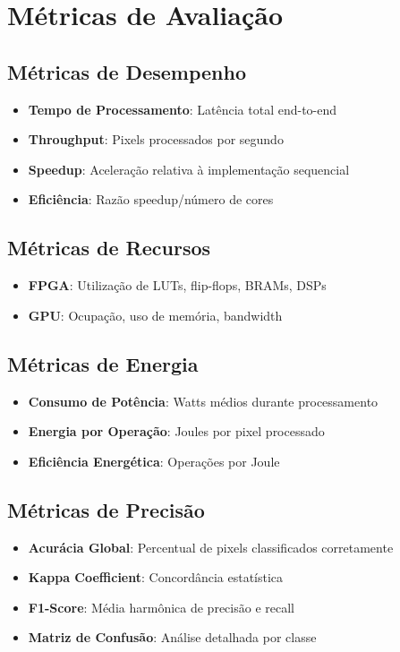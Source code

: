 \section{Métricas de Avaliação}\label{sec:metricas}

\subsection{Métricas de Desempenho}
\begin{itemize}
    \item \textbf{Tempo de Processamento}: Latência total end-to-end
    \item \textbf{Throughput}: Pixels processados por segundo
    \item \textbf{Speedup}: Aceleração relativa à implementação sequencial
    \item \textbf{Eficiência}: Razão speedup/número de cores
\end{itemize}

\subsection{Métricas de Recursos}
\begin{itemize}
    \item \textbf{FPGA}: Utilização de LUTs, flip-flops, BRAMs, DSPs
    \item \textbf{GPU}: Ocupação, uso de memória, bandwidth
\end{itemize}

\subsection{Métricas de Energia}
\begin{itemize}
    \item \textbf{Consumo de Potência}: Watts médios durante processamento
    \item \textbf{Energia por Operação}: Joules por pixel processado
    \item \textbf{Eficiência Energética}: Operações por Joule
\end{itemize}

\subsection{Métricas de Precisão}
\begin{itemize}
    \item \textbf{Acurácia Global}: Percentual de pixels classificados corretamente
    \item \textbf{Kappa Coefficient}: Concordância estatística
    \item \textbf{F1-Score}: Média harmônica de precisão e recall
    \item \textbf{Matriz de Confusão}: Análise detalhada por classe
\end{itemize}


